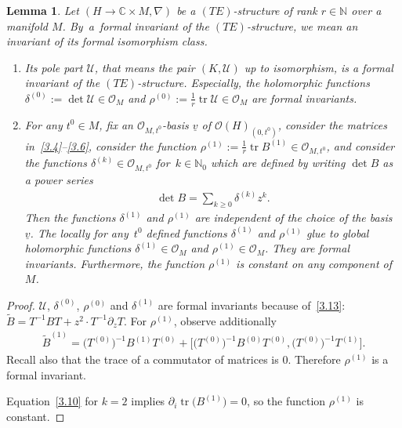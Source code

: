 \documentclass[10pt,a4paper]{amsart}
\numberwithin{equation}{section}
\numberwithin{figure}{section}
\newcommand{\N}{{\mathbb N}}
\newcommand{\C}{{\mathbb C}}
\newcommand{\OO}{{\mathcal O}}
\newcommand{\UU}{{\mathcal U}}
\newcommand{\www}{\widetilde}
\newcommand{\uuuu}{\underline}
\newcommand{\paa}{\partial}
\newcommand{\nnn}{\nabla}
\DeclareMathOperator{\tr}{tr}
\newtheorem{Lemma}[Theorem]{Lemma}
\begin{document}
\begin{Lemma}\label{t3.9}
Let $(H\to\C\times M,\nnn)$ be a $(TE)$-structure
of rank $r\in\N$ over a manifold $M$.
By~a~for\-mal invariant of the $(TE)$-structure,
we mean an invariant of its formal isomorphism class.

\begin{enumerate}\itemsep=0pt
\item[$(a)$] Its pole part $\UU$, that means the pair $(K,\UU)$
up to isomorphism, is a formal invariant of the
$(TE)$-structure. Especially, the holomorphic functions
$\delta^{(0)}:=\det\UU\in\OO_M$ and
$\rho^{(0)}:=\frac{1}{r}\tr\UU\allowbreak\in\OO_M$ are formal invariants.

\item[$(b)$] For any $t^0\in M$, fix an $\OO_{M,t^0}$-basis $\uuuu{v}$
of $\OO(H)_{(0,t^0)}$,
consider the matrices in~\eqref{3.4}--\eqref{3.6},
consider the function $\rho^{(1)}:=\frac{1}{r}\tr B^{(1)}\in\OO_{M,t^0}$,
and consider the functions
$\delta^{(k)}\in\OO_{M,t^0}$ for~$k\in\N_0$
which are defined by writing $\det B$ as a power series
\begin{gather*}%
\det B=\sum_{k\geq 0}\delta^{(k)}z^k.
\end{gather*}
Then the functions $\delta^{(1)}$ and $\rho^{(1)}$ are
independent of the choice of the basis $\uuuu{v}$.
The locally for any~$t^0$ defined functions $\delta^{(1)}$ and
$\rho^{(1)}$ glue to global holomorphic functions
$\delta^{(1)}\in\OO_M$ and $\rho^{(1)}\in\OO_M$.
They are formal invariants.
Furthermore, the function $\rho^{(1)}$ is constant
on any component of $M$.
\end{enumerate}
\end{Lemma}

\begin{proof} $\UU$, $\delta^{(0)}$, $\rho^{(0)}$ and $\delta^{(1)}$
are formal invariants because of~\eqref{3.13}:
$\www B = T^{-1}BT+z^2 \cdot T^{-1}\paa_z T.$
For $\rho^{(1)}$, observe additionally
\begin{gather*}
{\www B}^{(1)}= \big(T^{(0)}\big)^{-1}B^{(1)}T^{(0)}
+ \big[\big(T^{(0)}\big)^{-1}B^{(0)}T^{(0)}, \big(T^{(0)}\big)^{-1}T^{(1)}\big].
\end{gather*}
Recall also that the trace of a commutator of matrices is 0.
Therefore $\rho^{(1)}$ is a formal invariant.

Equation~\eqref{3.10} for $k=2$ implies
$\paa_i\tr \big(B^{(1)}\big)=0$, so the function $\rho^{(1)}$ is constant.
\end{proof}
\end{document}
